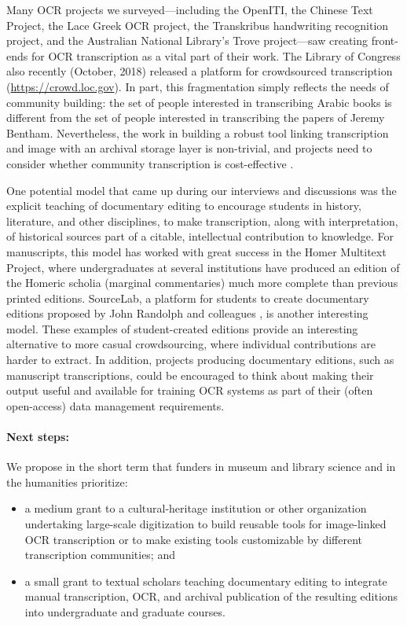 \documentclass[twoside,11pt]{report}
\begin{document}
Many OCR projects we surveyed---including the OpenITI, the Chinese Text Project, the Lace Greek OCR project, the Transkribus handwriting recognition project, and the Australian National Library's Trove project---saw creating front-ends for OCR transcription as a vital part of their work. The Library of Congress also recently (October, 2018) released a platform for crowdsourced transcription (\url{https://crowd.loc.gov}). In part, this fragmentation simply reflects the needs of community building: the set of people interested in transcribing Arabic books is different from the set of people interested in transcribing the papers of Jeremy Bentham. Nevertheless, the work in building a robust tool linking transcription and image with an archival storage layer is non-trivial, and projects need to consider whether community transcription is cost-effective \citep{causer18:_makin_such_bargain}.

One potential model that came up during our interviews and discussions was the explicit teaching of documentary editing to encourage students in history, literature, and other disciplines, to make transcription, along with interpretation, of historical sources part of a citable, intellectual contribution to knowledge. For manuscripts, this model has worked with great success in the Homer Multitext Project, where undergraduates at several institutions have produced an edition of the Homeric scholia (marginal commentaries) much more complete than previous printed editions. SourceLab, a platform for students to create documentary editions proposed by John Randolph and colleagues \citep{randolph17:sourcelab}, is another interesting model. These examples of student-created editions provide an interesting alternative to more casual crowdsourcing, where individual contributions are harder to extract. In addition, projects producing documentary editions, such as manuscript transcriptions, could be encouraged to think about making their output useful and available for training OCR systems as part of their (often open-access) data management requirements.

\paragraph{Next steps:} We propose in the short term that funders in museum and library science and in the humanities prioritize:
\begin{itemize}

\item a medium grant to a cultural-heritage institution or other organization undertaking large-scale digitization to build reusable tools for image-linked OCR transcription or to make existing tools customizable by different transcription communities; and

\item a small grant to textual scholars teaching documentary editing to integrate manual transcription, OCR, and archival publication of the resulting editions into undergraduate and graduate courses.

\end{itemize}
\end{document}
